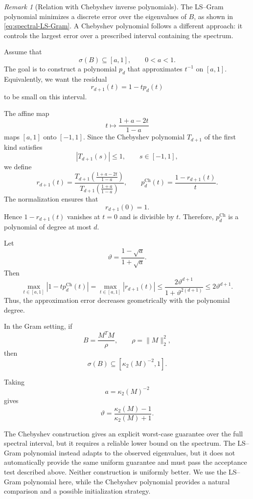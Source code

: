 \documentclass[12pt,a4paper]{article}
\theoremstyle{plain}
\theoremstyle{definition}
\theoremstyle{remark}
\newtheorem{remark}[theorem]{Remark}
\begin{document}
\begin{remark}[Relation with Chebyshev inverse polynomials]
\label{rem:LS-versus-Chebyshev}
The LS--Gram polynomial minimizes a discrete error over the eigenvalues of $B$, as shown in \eqref{eq:spectral-LS-Gram}. A Chebyshev polynomial follows a different approach: it controls the largest error over a prescribed interval containing the spectrum.

Assume that
\[
    \sigma(B)\subseteq [a,1], \qquad 0<a<1.
\]
The goal is to construct a polynomial $p_d$ that approximates $t^{-1}$ on $[a,1]$. Equivalently, we want the residual
\[
    r_{d+1}(t)=1-tp_d(t)
\]
to be small on this interval.

The affine map
\[
    t\longmapsto \frac{1+a-2t}{1-a}
\]
maps $[a,1]$ onto $[-1,1]$. Since the Chebyshev polynomial $T_{d+1}$ of the first kind satisfies
\[
    \left|T_{d+1}(s)\right|\leq 1, \qquad s \in[-1,1],
\]
we define
\[
    r_{d+1}(t) = \frac{T_{d+1}\!\left(\frac{1+a-2t}{1-a}\right)}{T_{d+1}\!\left(\frac{1+a}{1-a}\right)}, \qquad p_d^{\mathrm{Ch}}(t) = \frac{1-r_{d+1}(t)}{t}.
\]
The normalization ensures that
\[
    r_{d+1}(0)=1.
\]
Hence $1-r_{d+1}(t)$ vanishes at $t=0$ and is divisible by $t$. Therefore, $p_d^{\mathrm{Ch}}$ is a polynomial of degree at most $d$.

Let
\[
    \vartheta = \frac{1-\sqrt{a}}{1+\sqrt{a}}.
\]
Then
\begin{equation} \label{eq:Chebyshev-inverse-bound}
    \max_{t\in[a,1]} \left|1-tp_d^{\mathrm{Ch}}(t)\right| =\max_{t\in[a,1]} \left|r_{d+1}(t)\right| \leq \frac{2\vartheta^{d+1}} {1+\vartheta^{2(d+1)}} \leq 2\vartheta^{d+1}.
\end{equation}
Thus, the approximation error decreases geometrically with the polynomial degree.

In the Gram setting, if
\[
    B=\frac{M^TM}{\rho}, \qquad \rho=\|M\|_2^2,
\]
then
\[
    \sigma(B) \subseteq \left[\kappa_2(M)^{-2},1\right].
\]

Taking
\[
    a=\kappa_2(M)^{-2}
\]
gives
\[
    \vartheta = \frac{\kappa_2(M)-1} {\kappa_2(M)+1}.
\]

The Chebyshev construction gives an explicit worst-case guarantee over the full spectral interval, but it requires a reliable lower bound on the spectrum. The LS--Gram polynomial instead adapts to the observed eigenvalues, but it does not automatically provide the same uniform guarantee and must pass the acceptance test described above. Neither construction is uniformly better. We use the LS--Gram polynomial here, while the Chebyshev polynomial provides a natural comparison and a possible initialization strategy.
\end{remark}
\end{document}
